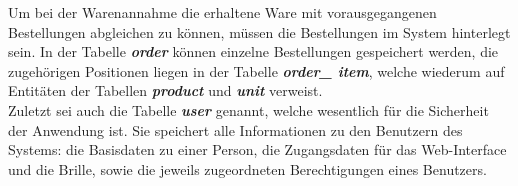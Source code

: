 Um bei der Warenannahme die erhaltene Ware mit vorausgegangenen Bestellungen abgleichen zu können, müssen die Bestellungen im System hinterlegt sein. In der Tabelle \textit{\textbf{order}} können einzelne Bestellungen gespeichert werden, die zugehörigen Positionen liegen in der Tabelle \textit{\textbf{order\_ item}}, welche wiederum auf Entitäten der Tabellen  \textit{\textbf{product}} und \textit{\textbf{unit}} verweist.\\

Zuletzt sei auch die Tabelle \textit{\textbf{user}} genannt, welche wesentlich für die Sicherheit der Anwendung ist. Sie speichert alle Informationen zu den Benutzern des Systems: die Basisdaten zu einer Person, die Zugangsdaten für das Web-Interface und die Brille, sowie die jeweils zugeordneten Berechtigungen eines Benutzers.\\





